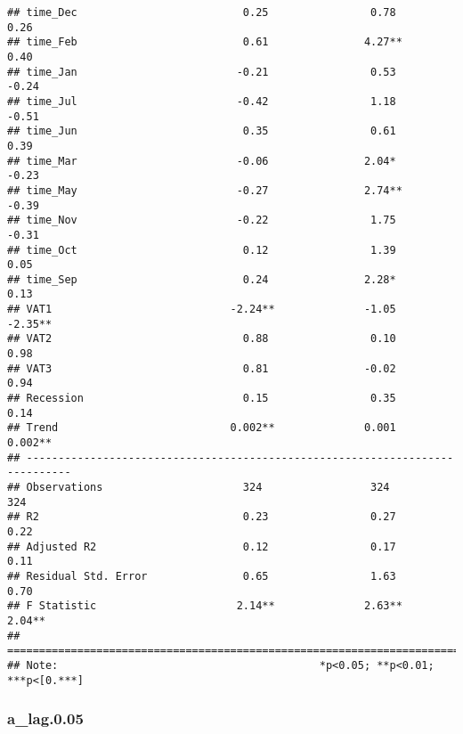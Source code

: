 \documentclass[
]{article}
\begin{document}
\begin{verbatim}
## time_Dec                          0.25                0.78        0.26       
## time_Feb                          0.61               4.27**       0.40       
## time_Jan                         -0.21                0.53        -0.24      
## time_Jul                         -0.42                1.18        -0.51      
## time_Jun                          0.35                0.61        0.39       
## time_Mar                         -0.06               2.04*        -0.23      
## time_May                         -0.27               2.74**       -0.39      
## time_Nov                         -0.22                1.75        -0.31      
## time_Oct                          0.12                1.39        0.05       
## time_Sep                          0.24               2.28*        0.13       
## VAT1                            -2.24**              -1.05       -2.35**     
## VAT2                              0.88                0.10        0.98       
## VAT3                              0.81               -0.02        0.94       
## Recession                         0.15                0.35        0.14       
## Trend                           0.002**              0.001       0.002**     
## -----------------------------------------------------------------------------
## Observations                      324                 324          324       
## R2                                0.23                0.27        0.22       
## Adjusted R2                       0.12                0.17        0.11       
## Residual Std. Error               0.65                1.63        0.70       
## F Statistic                      2.14**              2.63**      2.04**      
## =============================================================================
## Note:                                         *p<0.05; **p<0.01; ***p<[0.***]
\end{verbatim}

\hypertarget{a_lag.0.05}{%
\subsubsection{a\_lag.0.05}\label{a_lag.0.05}}
\end{document}
